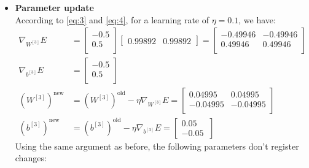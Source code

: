 \documentclass{exam}
\begin{document}
\begin{questions}
\begin{itemize}
                \item \textbf{Parameter update} \\
                According to \eqref{eq:3} and \eqref{eq:4}, for a learning rate of $\eta = 0.1$, we have:
                \begin{align*}
                    \nabla_{W^{[3]}} E &= 
                    \begin{bmatrix}
                        -0.5  \\
                        0.5  \\
                    \end{bmatrix}
                    \begin{bmatrix}
                        0.99892  & 
                        0.99892  
                    \end{bmatrix} = 
                    \begin{bmatrix}
                        -0.49946 & -0.49946  \\
                        0.49946 & 0.49946  \\
                    \end{bmatrix} \\
                    \nabla_{b^{[3]}} E &= 
                    \begin{bmatrix}
                        -0.5  \\
                        0.5  \\
                    \end{bmatrix} \\
                    (W^{[3]})^{\text{new}} &= (W^{[3]})^{\text{old}} - \eta \nabla_{W^{[3]}} E = 
                    \begin{bmatrix}
                        0.04995 & 0.04995  \\
                        -0.04995 & -0.04995  \\
                    \end{bmatrix} \\
                    (b^{[3]})^{\text{new}} &= (b^{[3]})^{\text{old}} - \eta \nabla_{b^{[3]}} E = 
                    \begin{bmatrix}
                        0.05  \\
                         -0.05  \
                    \end{bmatrix}
                \end{align*}
                Using the same argument as before, the following parameters don't register changes:

\end{itemize}
\end{questions}
\end{document}
